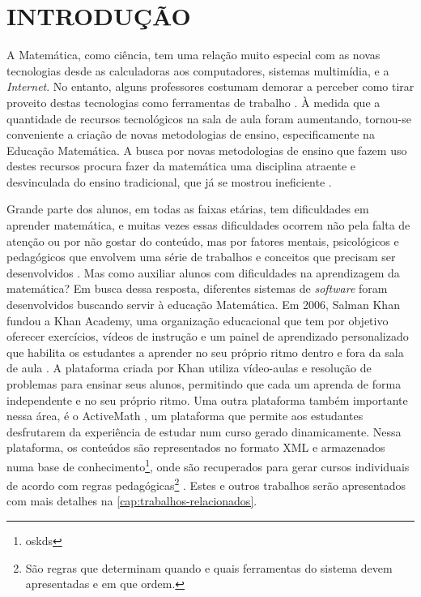 \chapter{INTRODUÇÃO}
\label{cap:introducao}

A Matemática, como ciência, tem uma relação muito especial com as novas tecnologias desde as calculadoras aos computadores, sistemas 
multim\'idia, e a \textit{Internet}. No entanto, alguns professores costumam demorar a perceber como tirar proveito destas tecnologias como 
ferramentas de trabalho \cite{da1997ensino}. \`A medida que a quantidade de recursos tecnológicos na sala de aula foram aumentando, 
tornou-se conveniente a criação de novas metodologias de ensino, especificamente na Educação Matemática. A busca por novas 
metodologias de ensino que fazem uso destes recursos procura fazer da matemática uma disciplina atraente e desvinculada do ensino 
tradicional, que já se mostrou ineficiente \cite{silva2009ambiente}.

Grande parte dos alunos, em todas as faixas etárias, tem dificuldades em aprender matemática, e muitas vezes essas dificuldades ocorrem 
não pela falta de atenção ou 
por não gostar do conteúdo, mas por fatores mentais, psicológicos e pedag\'ogicos que envolvem uma série de trabalhos e conceitos que 
precisam ser desenvolvidos \cite{de2006dificuldades}. Mas como auxiliar alunos com dificuldades na aprendizagem da matemática? Em busca 
dessa resposta, diferentes sistemas de \textit{software} foram desenvolvidos buscando servir \`a  educação Matem\'atica. Em 2006, Salman 
Khan fundou a Khan Academy, uma organização educacional que tem por objetivo oferecer exercícios, vídeos de instrução e um painel de 
aprendizado personalizado que habilita os estudantes a aprender no seu próprio ritmo dentro e fora da sala de aula \cite{khan2012one}. A 
plataforma criada por Khan utiliza vídeo-aulas e resolução de problemas para ensinar seus alunos, permitindo que cada um aprenda de forma 
independente e no seu pr\'oprio ritmo. Uma outra plataforma também  importante nessa área, \'e o ActiveMath 
\cite{melis2001activemath}, um plataforma que permite aos estudantes desfrutarem da experiência de estudar num 
curso gerado dinamicamente. Nessa plataforma, os conte\'udos s\~ao representados no formato XML \cite{bray1998extensible} e armazenados 
numa base de conhecimento\footnote{oskds}, onde s\~ao recuperados para gerar cursos individuais de acordo com regras 
pedagógicas\footnote{S\~ao regras que determinam quando e quais ferramentas do sistema devem apresentadas e em que ordem.} 
\cite{melis2004activemath}. Estes e outros trabalhos serão apresentados com mais detalhes na \autoref{cap:trabalhos-relacionados}.

